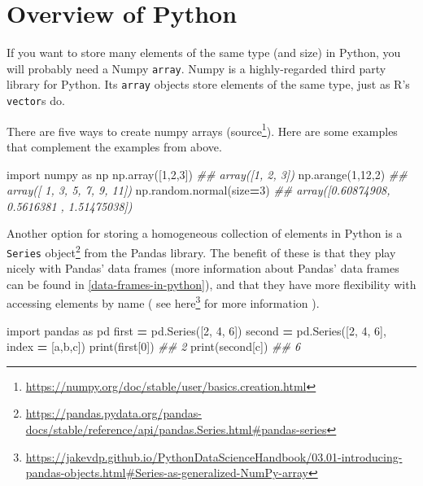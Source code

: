 \documentclass[
  12pt,
  krantz2]{krantz}
\makeatletter
\newenvironment{Shaded}{\begin{snugshade}}{\end{snugshade}}
\newcommand{\BuiltInTok}[1]{#1}
\newcommand{\CommentTok}[1]{\textcolor[rgb]{0.37,0.37,0.37}{\textit{#1}}}
\newcommand{\DecValTok}[1]{\textcolor[rgb]{0.06,0.06,0.06}{#1}}
\newcommand{\ImportTok}[1]{#1}
\newcommand{\NormalTok}[1]{#1}
\newcommand{\OperatorTok}[1]{\textcolor[rgb]{0.43,0.43,0.43}{\textbf{#1}}}
\newcommand{\StringTok}[1]{\textcolor[rgb]{0.5,0.5,0.5}{#1}}
\renewcommand{\href}[2]{#2\footnote{\url{#1}}}
\newenvironment{kframe}{%
\medskip{}
\setlength{\fboxsep}{.8em}
 \def\at@end@of@kframe{}%
 \ifinner\ifhmode%
  \def\at@end@of@kframe{\end{minipage}}%
  \begin{minipage}{\columnwidth}%
 \fi\fi%
 \def\FrameCommand##1{\hskip\@totalleftmargin \hskip-\fboxsep
 \colorbox{shadecolor}{##1}\hskip-\fboxsep
     \hskip-\linewidth \hskip-\@totalleftmargin \hskip\columnwidth}%
 \MakeFramed {\advance\hsize-\width
   \@totalleftmargin\z@ \linewidth\hsize
   \@setminipage}}%
 {\par\unskip\endMakeFramed%
 \at@end@of@kframe}
\renewenvironment{Shaded}{\begin{kframe}}{\end{kframe}}
\makeatother
\begin{document}
\hypertarget{overview-of-python}{%
\section{Overview of Python}\label{overview-of-python}}

If you want to store many elements of the same type (and size) in Python, you will probably need a Numpy \texttt{array}. Numpy is a highly-regarded third party library \citep{harris2020array} for Python. Its \texttt{array} objects store elements of the same type, just as R's \texttt{vector}s do.

There are five ways to create numpy arrays (\href{https://numpy.org/doc/stable/user/basics.creation.html}{source}). Here are some examples that complement the examples from above.

\begin{Shaded}
\begin{Highlighting}[]
\ImportTok{import}\NormalTok{ numpy }\ImportTok{as}\NormalTok{ np   }
\NormalTok{np.array([}\DecValTok{1}\NormalTok{,}\DecValTok{2}\NormalTok{,}\DecValTok{3}\NormalTok{])}
\CommentTok{\#\# array([1, 2, 3])}
\NormalTok{np.arange(}\DecValTok{1}\NormalTok{,}\DecValTok{12}\NormalTok{,}\DecValTok{2}\NormalTok{)}
\CommentTok{\#\# array([ 1,  3,  5,  7,  9, 11])}
\NormalTok{np.random.normal(size}\OperatorTok{=}\DecValTok{3}\NormalTok{)}
\CommentTok{\#\# array([0.60874908, 0.5616381 , 1.51475038])}
\end{Highlighting}
\end{Shaded}

Another option for storing a homogeneous collection of elements in Python is a \href{https://pandas.pydata.org/pandas-docs/stable/reference/api/pandas.Series.html\#pandas-series}{\texttt{Series} object} from the Pandas library. The benefit of these is that they play nicely with Pandas' data frames (more information about Pandas' data frames can be found in \ref{data-frames-in-python}), and that they have more flexibility with accessing elements by name ( see \href{https://jakevdp.github.io/PythonDataScienceHandbook/03.01-introducing-pandas-objects.html\#Series-as-generalized-NumPy-array}{here} for more information ).

\begin{Shaded}
\begin{Highlighting}[]
\ImportTok{import}\NormalTok{ pandas }\ImportTok{as}\NormalTok{ pd}
\NormalTok{first }\OperatorTok{=}\NormalTok{ pd.Series([}\DecValTok{2}\NormalTok{, }\DecValTok{4}\NormalTok{, }\DecValTok{6}\NormalTok{])}
\NormalTok{second }\OperatorTok{=}\NormalTok{ pd.Series([}\DecValTok{2}\NormalTok{, }\DecValTok{4}\NormalTok{, }\DecValTok{6}\NormalTok{], index }\OperatorTok{=}\NormalTok{ [}\StringTok{\textquotesingle{}a\textquotesingle{}}\NormalTok{,}\StringTok{\textquotesingle{}b\textquotesingle{}}\NormalTok{,}\StringTok{\textquotesingle{}c\textquotesingle{}}\NormalTok{])}
\BuiltInTok{print}\NormalTok{(first[}\DecValTok{0}\NormalTok{])}
\CommentTok{\#\# 2}
\BuiltInTok{print}\NormalTok{(second[}\StringTok{\textquotesingle{}c\textquotesingle{}}\NormalTok{])}
\CommentTok{\#\# 6}
\end{Highlighting}
\end{Shaded}
\end{document}
